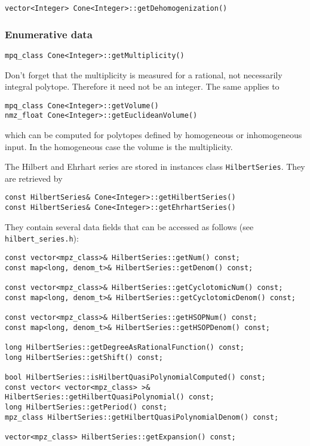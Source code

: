 \begin{small}
\begin{Verbatim}
vector<Integer> Cone<Integer>::getDehomogenization()
\end{Verbatim}

\subsubsection{Enumerative data}

\begin{Verbatim}
mpq_class Cone<Integer>::getMultiplicity()
\end{Verbatim}
Don't forget that the multiplicity is measured for a rational, not necessarily integral polytope. Therefore it need not be an integer. The same applies to
\begin{Verbatim}
mpq_class Cone<Integer>::getVolume()
nmz_float Cone<Integer>::getEuclideanVolume()
\end{Verbatim}
which can be computed for polytopes defined by homogeneous or inhomogeneous input. In the homogeneous case the volume is the multiplicity.

The Hilbert and Ehrhart series are stored in instances class \verb|HilbertSeries|. They are retrieved by
\begin{Verbatim}
const HilbertSeries& Cone<Integer>::getHilbertSeries()
const HilbertSeries& Cone<Integer>::getEhrhartSeries()
\end{Verbatim}
They contain several data fields that can be accessed as follows (see \verb|hilbert_series.h|):
\begin{Verbatim}
const vector<mpz_class>& HilbertSeries::getNum() const;
const map<long, denom_t>& HilbertSeries::getDenom() const;

const vector<mpz_class>& HilbertSeries::getCyclotomicNum() const;
const map<long, denom_t>& HilbertSeries::getCyclotomicDenom() const;

const vector<mpz_class>& HilbertSeries::getHSOPNum() const;
const map<long, denom_t>& HilbertSeries::getHSOPDenom() const;

long HilbertSeries::getDegreeAsRationalFunction() const;
long HilbertSeries::getShift() const;

bool HilbertSeries::isHilbertQuasiPolynomialComputed() const;
const vector< vector<mpz_class> >& HilbertSeries::getHilbertQuasiPolynomial() const;
long HilbertSeries::getPeriod() const;
mpz_class HilbertSeries::getHilbertQuasiPolynomialDenom() const;

vector<mpz_class> HilbertSeries::getExpansion() const;
\end{Verbatim}


\end{small}
